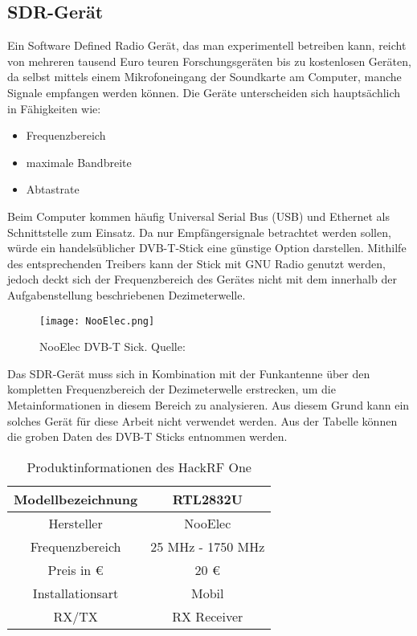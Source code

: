 \subsection{SDR-Gerät} 
Ein Software Defined Radio Gerät, das man experimentell betreiben kann, reicht von mehreren tausend Euro teuren Forschungsgeräten bis zu kostenlosen Geräten, da selbst mittels einem Mikrofoneingang der Soundkarte am Computer, manche Signale empfangen werden können. Die Geräte unterscheiden sich hauptsächlich in Fähigkeiten wie:

\begin{itemize}
	\item Frequenzbereich
	\item maximale Bandbreite
	\item Abtastrate
\end{itemize}

Beim Computer kommen häufig Universal Serial Bus (USB) und Ethernet als Schnittstelle zum  Einsatz.
Da nur Empfängersignale betrachtet werden sollen, würde ein handelsüblicher DVB-T-Stick eine günstige Option darstellen. Mithilfe des entsprechenden Treibers kann der Stick mit GNU Radio genutzt werden, jedoch deckt sich der Frequenzbereich des Gerätes nicht mit dem innerhalb der Aufgabenstellung beschriebenen Dezimeterwelle.\\

\begin{figure}[H]
	\centering
	\texttt{[image: NooElec.png]}
	\caption[NooElec DVB-T Stick]{NooElec DVB-T Sick. Quelle: \cite{NooElec:2018}} 
	\label{NooElec}
\end{figure}

Das SDR-Gerät muss sich in Kombination mit der Funkantenne über den kompletten Frequenzbereich der Dezimeterwelle erstrecken, um die Metainformationen in diesem Bereich zu analysieren. Aus diesem Grund kann ein solches Gerät für diese Arbeit nicht verwendet werden. Aus der Tabelle können die groben Daten des DVB-T Sticks entnommen werden.\\

\begin{table}[h]
	\centering
	\begin{tabular}{c|c}
		Modellbezeichnung & RTL2832U\\
		\hline
		Hersteller & NooElec\\ 
		\hline 
		Frequenzbereich & 25 MHz - 1750 MHz \\ 
		\hline 
		Preis in \euro & 20 \euro \\ 
		\hline 
		Installationsart & Mobil \\ 
		\hline 
		RX/TX & RX Receiver \\ 
	\end{tabular} 
	\caption{Produktinformationen des HackRF One}
\end{table}

